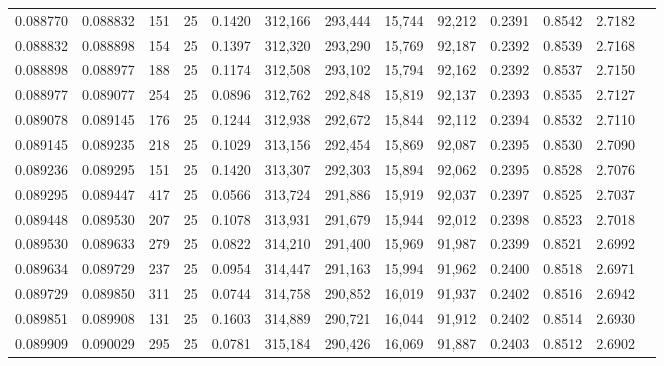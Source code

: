 \begin{tabular}{rrrrrrrrrrrrr}
0.088770 & 0.088832 &   151 &  25 &                                     0.1420 & 312,166 & 293,444 &  15,744 &  92,212 & 0.2391 & 0.8542 & 2.7182 \\
0.088832 & 0.088898 &   154 &  25 &                                     0.1397 & 312,320 & 293,290 &  15,769 &  92,187 & 0.2392 & 0.8539 & 2.7168 \\
0.088898 & 0.088977 &   188 &  25 &                                     0.1174 & 312,508 & 293,102 &  15,794 &  92,162 & 0.2392 & 0.8537 & 2.7150 \\
0.088977 & 0.089077 &   254 &  25 &                                     0.0896 & 312,762 & 292,848 &  15,819 &  92,137 & 0.2393 & 0.8535 & 2.7127 \\
0.089078 & 0.089145 &   176 &  25 &                                     0.1244 & 312,938 & 292,672 &  15,844 &  92,112 & 0.2394 & 0.8532 & 2.7110 \\
0.089145 & 0.089235 &   218 &  25 &                                     0.1029 & 313,156 & 292,454 &  15,869 &  92,087 & 0.2395 & 0.8530 & 2.7090 \\
0.089236 & 0.089295 &   151 &  25 &                                     0.1420 & 313,307 & 292,303 &  15,894 &  92,062 & 0.2395 & 0.8528 & 2.7076 \\
0.089295 & 0.089447 &   417 &  25 &                                     0.0566 & 313,724 & 291,886 &  15,919 &  92,037 & 0.2397 & 0.8525 & 2.7037 \\
0.089448 & 0.089530 &   207 &  25 &                                     0.1078 & 313,931 & 291,679 &  15,944 &  92,012 & 0.2398 & 0.8523 & 2.7018 \\
0.089530 & 0.089633 &   279 &  25 &                                     0.0822 & 314,210 & 291,400 &  15,969 &  91,987 & 0.2399 & 0.8521 & 2.6992 \\
0.089634 & 0.089729 &   237 &  25 &                                     0.0954 & 314,447 & 291,163 &  15,994 &  91,962 & 0.2400 & 0.8518 & 2.6971 \\
0.089729 & 0.089850 &   311 &  25 &                                     0.0744 & 314,758 & 290,852 &  16,019 &  91,937 & 0.2402 & 0.8516 & 2.6942 \\
0.089851 & 0.089908 &   131 &  25 &                                     0.1603 & 314,889 & 290,721 &  16,044 &  91,912 & 0.2402 & 0.8514 & 2.6930 \\
0.089909 & 0.090029 &   295 &  25 &                                     0.0781 & 315,184 & 290,426 &  16,069 &  91,887 & 0.2403 & 0.8512 & 2.6902 \\

\end{tabular}
